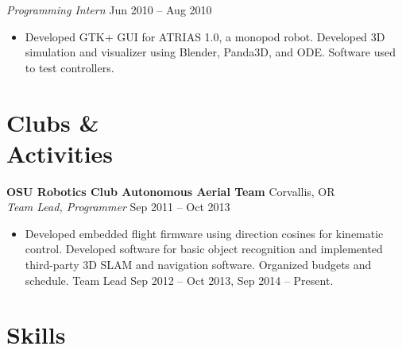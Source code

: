 \documentclass[10pt,letterpaper,margin]{res}
\begin{document}
\begin{resume}
{\it Programming Intern} \hfill {\color{lightgray} Jun 2010 -- Aug 2010}\vspace{0.0em}

\begin{itemize}
    \item Developed GTK+ GUI for ATRIAS 1.0, a monopod robot. Developed 3D
        simulation and visualizer using Blender, Panda3D, and ODE. Software
        used to test controllers.
\end{itemize}



\section{Clubs \& \\ Activities}

{\bf OSU Robotics Club Autonomous Aerial Team} \hfill {\color{lightgray} Corvallis, OR} \\
{\it Team Lead, Programmer} \hfill {\color{lightgray} Sep 2011 -- Oct 2013}\vspace{0.0em}

\begin{itemize}
    \item Developed embedded flight firmware using direction cosines for
        kinematic control. Developed software for basic object recognition and
        implemented third-party 3D SLAM and navigation software.  Organized
        budgets and schedule. Team Lead Sep 2012 -- Oct 2013, Sep 2014 --
        Present.
\end{itemize}



%
%


\section{Skills}


\end{resume}
\end{document}

